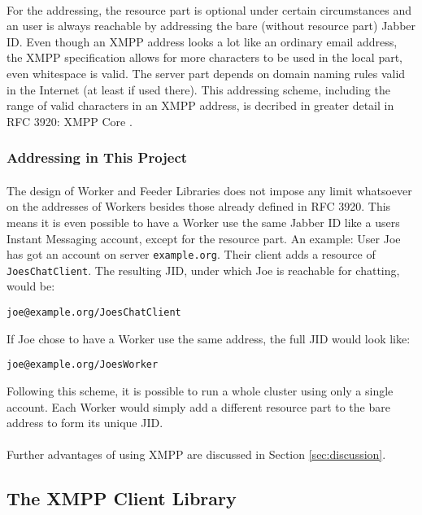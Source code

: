 \paragraph{}
For the addressing, the resource part is optional under certain circumstances and an user is always reachable by addressing the bare (without resource part) Jabber ID. Even though an XMPP address looks a lot like an ordinary email address, the XMPP specification allows for more characters to be used in the local part, even whitespace is valid. The server part depends on domain naming rules valid in the Internet (at least if used there). This addressing scheme, including the range of valid characters in an XMPP address, is decribed in greater detail in RFC 3920: XMPP Core \cite{xmpp-core}.

\subsubsection{Addressing in This Project}
\label{sec:addr}
\paragraph{}
The design of Worker and Feeder Libraries does not impose any limit whatsoever on the addresses of Workers besides those already defined in RFC 3920. This means it is even possible to have a Worker use the same Jabber ID like a users Instant Messaging account, except for the resource part. An example: User Joe has got an account on server \texttt{example.org}. Their client adds a resource of \texttt{JoesChatClient}. The resulting JID, under which Joe is reachable for chatting, would be:
\begin{center}
\texttt{joe@example.org/JoesChatClient}
\end{center}
If Joe chose to have a Worker use the same address, the full JID would look like:
\begin{center}
\texttt{joe@example.org/JoesWorker}
\end{center}
Following this scheme, it is possible to run a whole cluster using only a single account. Each Worker would simply add a different resource part to the bare address to form its unique JID.
\paragraph{}
Further advantages of using XMPP are discussed in Section \ref{sec:discussion}.

\subsection{The XMPP Client Library}
\label{sec:clientlib}
